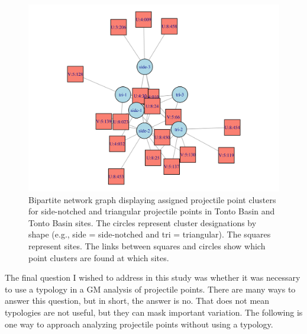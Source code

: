 \documentclass[a4paper]{article}
\begin{document}
\begin{figure}
\includegraphics[width=1\linewidth]{figures/TontoClusterNetwork} \caption{Bipartite network graph displaying assigned projectile point clusters for side-notched and triangular projectile points in Tonto Basin and Tonto Basin sites. The circles represent cluster designations by shape (e.g., side = side-notched and tri = triangular). The squares represent sites. The links between squares and circles show which point clusters are found at which sites.}\label{fig:TontoClusterNetwork}
\end{figure}

The final question I wished to address in this study was whether it was necessary to use a typology in a GM analysis of projectile points. There are many ways to answer this question, but in short, the answer is no. That does not mean typologies are not useful, but they can mask important variation. The following is one way to approach analyzing projectile points without using a typology.
\end{document}
